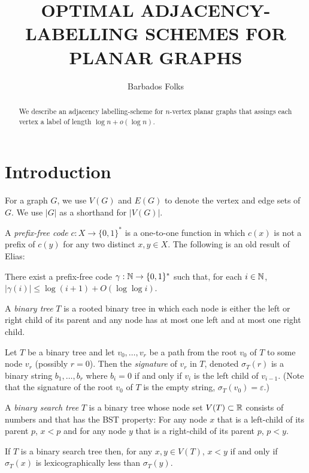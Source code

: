 \documentclass[kpfonts]{patmorin}
\title{\MakeUppercase{Optimal Adjacency-Labelling Schemes for Planar Graphs}}
\author{Barbados Folks}
\begin{document}
\maketitle

\begin{abstract}
  We describe an adjacency labelling-scheme for $n$-vertex planar graphs that assings each vertex a label of length $\log n+o(\log n)$.
\end{abstract}

\section{Introduction}


For a graph $G$, we use $V(G)$ and $E(G)$ to denote the vertex and edge sets of $G$.  We use $|G|$ as a shorthand for $|V(G)|$.

A \emph{prefix-free code} $c:X\to\{0,1\}^*$ is a one-to-one function in which $c(x)$ is not a prefix of $c(y)$ for any two distinct $x,y\in X$.
The following is an old result of Elias:

\begin{lem}
    There exist a prefix-free code $\gamma:\mathbb{N}\to\{0,1\}^*$ such that, for each $i\in\mathbb{N}$, $|\gamma(i)|\le \log(i+1)+O(\log\log i)$.
\end{lem}

A \emph{binary tree} $T$ is a rooted binary tree in which each node is either the left or right child of its parent and any node has at most one left and at most one right child.  

Let $T$ be a binary tree and let $v_0,\ldots,v_{r}$ be a path from the root $v_0$ of $T$ to some node $v_r$ (possibly $r=0$).  Then the \emph{signature} of $v_r$ in $T$, denoted $\sigma_T(r)$ is a binary string $b_1,\ldots,b_r$ where $b_i=0$ if and only if $v_{i}$ is the left child of $v_{i-1}$.  (Note that the signature of the root $v_0$ of $T$ is the empty string,  $\sigma_T(v_0)=\varepsilon$.)

A \emph{binary search tree} $T$ is a binary tree  whose node set $V(T)\subset\mathbb{R}$ consists of numbers and that has the BST property:  For any node $x$ that is a left-child of its parent $p$, $x<p$ and for any node $y$ that is a right-child of its parent $p$, $p<y$.  

\begin{obs}
  If $T$ is a binary search tree then, for any $x,y\in V(T)$, $x<y$ if and only if $\sigma_T(x)$ is lexicographically less than $\sigma_T(y)$.
\end{obs}
\end{document}
